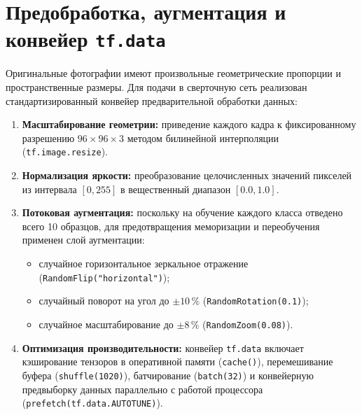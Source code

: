 \section{Предобработка, аугментация и конвейер \texttt{tf.data}}

Оригинальные фотографии имеют произвольные геометрические пропорции и пространственные размеры. Для подачи в сверточную сеть реализован стандартизированный конвейер предварительной обработки данных:
\begin{enumerate}
    \item \textbf{Масштабирование геометрии:} приведение каждого кадра к фиксированному разрешению $96 \times 96 \times 3$ методом билинейной интерполяции (\texttt{tf.image.resize}).
    \item \textbf{Нормализация яркости:} преобразование целочисленных значений пикселей из интервала $[0, 255]$ в вещественный диапазон $[0.0, 1.0]$.
    \item \textbf{Потоковая аугментация:} поскольку на обучение каждого класса отведено всего 10 образцов, для предотвращения меморизации и переобучения применен слой аугментации:
    \begin{itemize}
        \item случайное горизонтальное зеркальное отражение (\texttt{RandomFlip("horizontal")});
        \item случайный поворот на угол до $\pm 10\,\%$ (\texttt{RandomRotation(0.1)});
        \item случайное масштабирование до $\pm 8\,\%$ (\texttt{RandomZoom(0.08)}).
    \end{itemize}
    \item \textbf{Оптимизация производительности:} конвейер \texttt{tf.data} включает кэширование тензоров в оперативной памяти (\texttt{cache()}), перемешивание буфера (\texttt{shuffle(1020)}), батчирование (\texttt{batch(32)}) и конвейерную предвыборку данных параллельно с работой процессора (\texttt{prefetch(tf.data.AUTOTUNE)}).
\end{enumerate}
